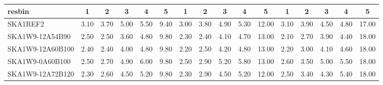 \begin{table}[H]
{{\begin{tabular}{|lccccc||ccccc||ccccc|}
 resbin  &1 & 2 & 3 & 4 & 5 & 1 & 2 & 3 & 4 & 5 & 1 & 2 & 3 & 4 & 5 \\ \hline
SKA1REF2 & 3.10 \cellcolor{blue!60.00} & 3.70 \cellcolor{red!60.00} & 5.00 \cellcolor{green!60.00} & 5.50 \cellcolor{orange!42.50} & 9.40 \cellcolor{purple!18.00} & 3.00 \cellcolor{blue!60.00} & 3.80 \cellcolor{red!60.00} & 4.90 \cellcolor{green!48.55} & 5.30 \cellcolor{orange!40.91} & 12.00 \cellcolor{purple!18.00} & 3.10 \cellcolor{blue!60.00} & 3.90 \cellcolor{red!60.00} & 4.50 \cellcolor{green!40.91} & 4.80 \cellcolor{orange!30.00} & 17.00 \cellcolor{purple!18.00}\\ \hline 
SKA1W9-12A54B90 & 2.50 \cellcolor{blue!32.00} & 2.50 \cellcolor{red!21.23} & 3.60 \cellcolor{green!18.00} & 4.80 \cellcolor{orange!18.00} & 9.80 \cellcolor{purple!60.00} & 2.30 \cellcolor{blue!23.25} & 2.40 \cellcolor{red!18.00} & 4.10 \cellcolor{green!18.00} & 4.70 \cellcolor{orange!18.00} & 13.00 \cellcolor{purple!60.00} & 2.10 \cellcolor{blue!18.00} & 2.70 \cellcolor{red!18.00} & 3.90 \cellcolor{green!18.00} & 4.40 \cellcolor{orange!18.00} & 18.00 \cellcolor{purple!60.00}\\ \hline 
SKA1W9-12A60B100 & 2.40 \cellcolor{blue!27.33} & 2.40 \cellcolor{red!18.00} & 4.00 \cellcolor{green!30.00} & 4.80 \cellcolor{orange!18.00} & 9.80 \cellcolor{purple!60.00} & 2.20 \cellcolor{blue!18.00} & 2.50 \cellcolor{red!21.00} & 4.20 \cellcolor{green!21.82} & 4.80 \cellcolor{orange!21.82} & 13.00 \cellcolor{purple!60.00} & 2.20 \cellcolor{blue!22.20} & 3.00 \cellcolor{red!28.50} & 4.10 \cellcolor{green!25.64} & 4.60 \cellcolor{orange!24.00} & 18.00 \cellcolor{purple!60.00}\\ \hline 
SKA1W9-0A60B100 & 2.50 \cellcolor{blue!32.00} & 2.70 \cellcolor{red!27.69} & 4.90 \cellcolor{green!57.00} & 6.00 \cellcolor{orange!60.00} & 9.80 \cellcolor{purple!60.00} & 2.50 \cellcolor{blue!33.75} & 2.90 \cellcolor{red!33.00} & 5.20 \cellcolor{green!60.00} & 5.80 \cellcolor{orange!60.00} & 13.00 \cellcolor{purple!60.00} & 2.60 \cellcolor{blue!39.00} & 3.50 \cellcolor{red!46.00} & 5.00 \cellcolor{green!60.00} & 5.50 \cellcolor{orange!51.00} & 18.00 \cellcolor{purple!60.00}\\ \hline 
SKA1W9-12A72B120 & 2.30 \cellcolor{blue!22.67} & 2.60 \cellcolor{red!24.46} & 4.50 \cellcolor{green!45.00} & 5.20 \cellcolor{orange!32.00} & 9.80 \cellcolor{purple!60.00} & 2.30 \cellcolor{blue!23.25} & 2.90 \cellcolor{red!33.00} & 4.50 \cellcolor{green!33.27} & 5.20 \cellcolor{orange!37.09} & 12.00 \cellcolor{purple!18.00} & 2.50 \cellcolor{blue!34.80} & 3.40 \cellcolor{red!42.50} & 4.30 \cellcolor{green!33.27} & 5.40 \cellcolor{orange!48.00} & 18.00 \cellcolor{purple!60.00}\\ \hline 

\end{tabular}}}
\end{table}
